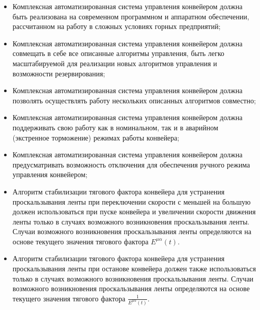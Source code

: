 \begin{itemize}
\item Комплексная автоматизированная система управления конвейером должна быть реализована на современном программном и аппаратном обеспечении, рассчитанном на работу в сложных условиях горных предприятий;
\item Комплексная автоматизированная система управления конвейером должна совмещать в себе все описанные алгоритмы управления, быть легко масштабируемой для реализации новых алгоритмов управления и возможности резервирования;
\item Комплексная автоматизированная система управления конвейером должна позволять осуществлять работу нескольких описанных алгоритмов совместно;
\item Комплексная автоматизированная система управления конвейером должна поддерживать свою работу как в номинальном, так и в аварийном (экстренное торможение) режимах работы конвейера;
\item Комплексная автоматизированная система управления конвейером должна предусматривать возможность отключения для обеспечения ручного режима управления конвейером;
\item Алгоритм стабилизации тягового фактора конвейера для устранения проскальзывания ленты при переключении скорости с меньшей на большую должен использоваться при пуске конвейера и увеличении скорости движения ленты только в случаях возможного возникновения проскальзывания ленты. Случаи возможного возникновения проскальзывания ленты определяются на основе текущего значения тягового фактора $ E^{\mu \alpha}(t) $.
\item Алгоритм стабилизации тягового фактора конвейера для устранения проскальзывания ленты при останове конвейера должен также использоваться только в случаях возможного возникновения проскальзывания ленты. Случаи возможного возникновения проскальзывания ленты определяются на основе текущего значения тягового фактора $ \frac{1}{E^{\mu \alpha}(t)} $.
\end{itemize}